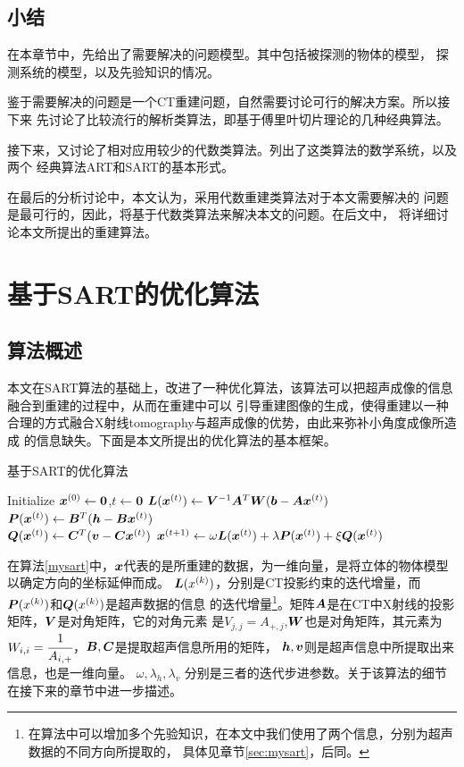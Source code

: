 \section{小结}
在本章节中，先给出了需要解决的问题模型。其中包括被探测的物体的模型，
探测系统的模型，以及先验知识的情况。

鉴于需要解决的问题是一个CT重建问题，自然需要讨论可行的解决方案。所以接下来
先讨论了比较流行的解析类算法，即基于傅里叶切片理论的几种经典算法。

接下来，又讨论了相对应用较少的代数类算法。列出了这类算法的数学系统，以及两个
经典算法ART和SART的基本形式。

在最后的分析讨论中，本文认为，采用代数重建类算法对于本文需要解决的
问题是最可行的，因此，将基于代数类算法来解决本文的问题。在后文中，
将详细讨论本文所提出的重建算法。


\chapter{基于SART的优化算法}
\section{算法概述}
本文在SART算法的基础上，改进了一种优化算法，该算法可以把超声成像的信息融合到重建的过程中，从而在重建中可以
引导重建图像的生成，使得重建以一种合理的方式融合X射线tomography与超声成像的优势，由此来弥补小角度成像所造成
的信息缺失。下面是本文所提出的优化算法的基本框架。
\begin{algo}\label{mysart}
基于SART的优化算法
\begin{algorithmic}[1]
\STATE
Initialize $\bm{ x}^{(0)} \leftarrow \bm{0}$,$t\leftarrow \bm{0}$
\REPEAT
\STATE
$\bm{L}(\bm{ x}^{(t)}) \leftarrow  \bm{V}^{-1}\bm{A}^T\bm{W}(\bm{b}-\bm{A}\bm{ x}^{(t)})$ \\
$\bm{P}(\bm{ x}^{(t)}) \leftarrow \bm{B}^{T}(\bm{h}-\bm{B}\bm{ x}^{(t)})$ \\    %
$\bm{Q}(\bm{ x}^{(t)}) \leftarrow \bm{C}^{T}(\bm{v}-\bm{C}\bm{ x}^{(t)})$         %
\STATE
$\bm{ x}^{(t+1)}\leftarrow \omega\bm{L}(\bm{ x}^{(t)}) + \lambda\bm{P}(\bm{ x}^{(t)}) + \xi\bm{Q}(\bm{ x}^{(t)})    $
\end{algorithmic}
\end{algo}

在算法\ref{mysart}中，$\bm{ x}$代表的是所重建的数据，为一维向量，是将立体的物体模型以确定方向的坐标延伸而成。
$\bm{L}(x^{(k)})$，分别是CT投影约束的迭代增量，而$\bm{P}(x^{(k)})$和$ \bm{Q}(x^{(k)})$是超声数据的信息
的迭代增量\footnote{在算法中可以增加多个先验知识，在本文中我们使用了两个信息，分别为超声数据的不同方向所提取的，
具体见章节\ref{sec:mysart}，后同。}。矩阵$\bm{A}$是在CT中X射线的投影矩阵，$\bm{V}$是对角矩阵，它的对角元素
是$V_{j,j}=A_{+,j}$,$\bm{W}$也是对角矩阵，其元素为$W_{i,i}=\cfrac{1}{A_{i,+}}$，$\bm{B},\bm{C}$是提取超声信息所用的矩阵，
$\bm{h},\bm{v}$则是超声信息中所提取出来信息，也是一维向量。
$\omega,\lambda_h,\lambda_v$
分别是三者的迭代步进参数。关于该算法的细节在接下来的章节中进一步描述。


